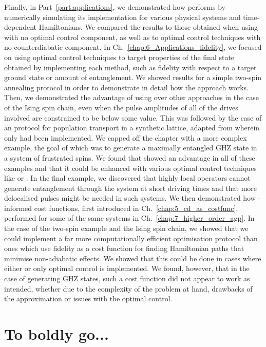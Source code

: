Finally, in Part~\ref{part:applications}, we demonstrated how  performs by numerically simulating its implementation for various physical systems and time-dependent Hamiltonians. We compared the results to those obtained when using  with no optimal control component, as well as to optimal control techniques with no counterdiabatic component. In Ch.~\ref{chap:6_Applications_fidelity}, we focused on using optimal control techniques to target properties of the final state obtained by implementing each method, such as fidelity with respect to a target ground state or amount of entanglement. We showed results for a simple two-spin annealing protocol in order to demonstrate in detail how the  approach works. Then, we demonstrated the advantage of using  over other approaches in the case of the Ising spin chain, even when the pulse amplitudes of all of the drives involved are constrained to be below some value. This was followed by the case of an  protocol for population transport in a synthetic lattice, adapted from \cite{meier_counterdiabatic_2020} wherein only  had been implemented. We capped off the chapter with a more complex example, the goal of which was to generate a maximally entangled GHZ state in a system of frustrated spins. We found that  showed an advantage in all of these examples and that it could be enhanced with various optimal control techniques like  or . In the final example, we discovered that highly local  operators cannot generate entanglement through the system at short driving times and that more delocalised pulses might be needed in such systems. We then demonstrated how -informed cost functions, first introduced in Ch.~\ref{chap:5_cd_as_costfunc}, performed for some of the same systems in Ch.~\ref{chap:7_higher_order_agp}. In the case of the two-spin example and the Ising spin chain, we showed that we could implement a far more computationally efficient optimisation protocol than ones which use fidelity as a cost function for finding Hamiltonian paths that minimise non-adiabatic effects. We showed that this could be done in cases where either  or only optimal control is implemented. We found, however, that in the case of generating GHZ states, such a cost function did not appear to work as intended, whether due to the complexity of the problem at hand, drawbacks of the  approximation or issues with the optimal control. 

\chapter{To boldly go...}\label{chap:9_Future_directions}

